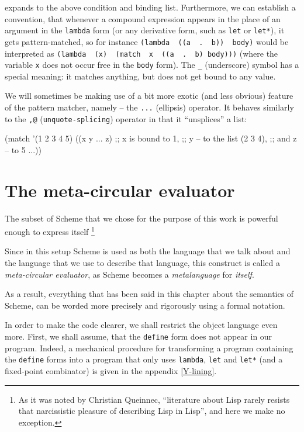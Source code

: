 expands to the above condition and binding list. Furthermore,
we can establish a convention, that whenever a compound expression
appears in the place of an argument in the \texttt{lambda}
form (or any derivative form, such as \texttt{let} or \texttt{let*}),
it gets pattern-matched, so for instance
\texttt{(lambda\,\,((a\,\,.\,\,b))\,\,body)}
would be interpreted as
\texttt{(lambda\,\,(x)\,\,(match\,\,x\,\,((a\,\,.\,\,b) body)))}
(where the variable \texttt{x} does not occur free in the \texttt{body}
form). The \texttt{\_} (underscore) symbol has a special meaning:
it matches anything, but does not get bound to any value.

We will sometimes be making use of a bit more exotic (and less obvious)
feature of the pattern matcher, namely -- the \texttt{...} (ellipsis)
operator. It behaves similarly to the \texttt{,@} (\texttt{unquote-splicing})
operator in that it ``unsplices'' a list:

\begin{Snippet}
  (match '(1 2 3 4 5)
    ((x y ... z)
     ;; x is bound to 1,
     ;; y -- to the list (2 3 4),
     ;; and z -- to 5
    ...))
\end{Snippet}

\section{The meta-circular evaluator}

The subset of Scheme that we chose for the purpose of this work
is powerful enough to express itself \footnote{As it was noted
  by Christian Queinnec, ``literature about Lisp rarely resists
  that narcissistic pleasure of describing Lisp in Lisp''\cite{Queinnec1996},
  and here we make no exception.}

Since in this setup Scheme is used as both the language that we
talk about and the language that we use to describe that language,
this construct is called a \textit{meta-circular evaluator}, as
Scheme becomes a \textit{metalanguage} for \textit{itself}.

As a result, everything that has been said in this chapter about
the semantics of Scheme, can be worded more precisely and rigorously
using a formal notation.

In order to make the code clearer, we shall restrict the object
language even more. First, we shall assume, that the \texttt{define}
form does not appear in our program. Indeed, a mechanical procedure
for transforming a program containing the \texttt{define} forms
into a program that only uses \texttt{lambda}, \texttt{let} and
\texttt{let*} (and a fixed-point combinator) is given in the appendix
\ref{Y-lining}.


